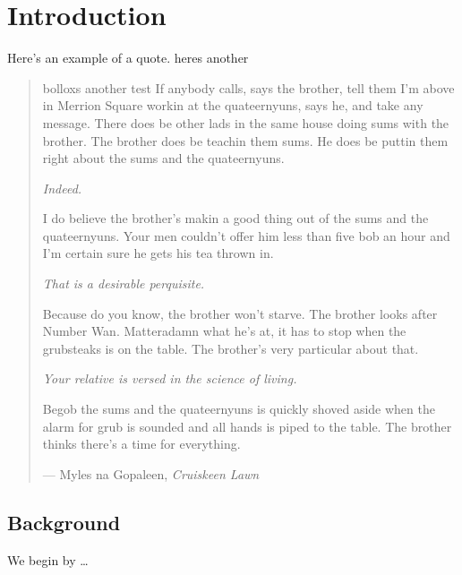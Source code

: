 %
%
%
%

\chapter{Introduction}\label{C.intro}



Here's an example of a quote. heres another

\begin{quote}
bolloxs another test
If anybody calls, says the brother, tell them I'm above in Merrion Square workin at the
quateernyuns, says he, and take any message.  There does be other lads in the same house
doing sums with the brother.  The brother does be teachin them sums.  He does be puttin
them right about the sums and the quateernyuns.

\textit{Indeed.}

I do believe the brother's makin a good thing out of the sums and the quateernyuns.  Your
men couldn't offer him less than five bob an hour and I'm certain sure he gets his tea
thrown in.

\textit{That is a desirable perquisite.}

Because do you know, the brother won't starve.  The brother looks after Number Wan.
Matteradamn what he's at, it has to stop when the grubsteaks is on the table.  The brother's
very particular about that.

\textit{Your relative is versed in the science of living.}

Begob the sums and the quateernyuns is quickly shoved aside when the alarm for grub is sounded
and all hands is piped to the table.  The brother thinks there's a time for everything.

\hspace{2cm}--- Myles na Gopaleen, \emph{Cruiskeen Lawn}
\end{quote}


\section{Background}\label{S.intro1}

We begin by \ldots

